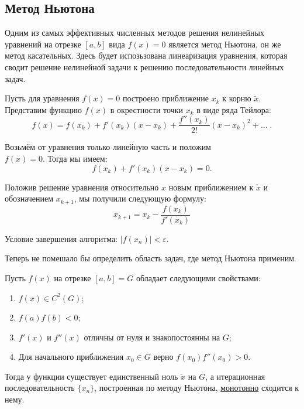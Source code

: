 \documentclass[../main.tex]{subfile}
\begin{document}
\subsection{Метод Ньютона}

Одним из самых эффективных численных методов решения нелинейных уравнений на
отрезке $[a,b]$ вида $f(x)=0$ является метод Ньютона, он же метод касательных.
Здесь будет испозьзована линеаризация уравнения, которая сводит решение
нелинейной задачи к решению последовательности линейных задач.

\begin{algorithm}\label{eq:newton_iteration}
	Пусть для уравнения $f(x)=0$ построено приближение $x_k$ к корню
	$\widetilde{x}$. Представим функцию $f(x)$ в окрестности точки $x_k$ в
	виде ряда Тейлора:
	\[f(x)=f(x_k)+f'(x_k)(x-x_k)+\frac{f''(x_k)}{2!}(x-x_k)^2+...\;.\]

	Возьмём от уравнения только линейную часть и положим \\
	$f(x)=0$. Тогда мы имеем:
	\[f(x_k)+f'(x_k)(x-x_k)=0.\]

	Положив решение уравнения относительно $x$ новым приближением к
	$\widetilde{x}$ и обозначением $x_{k+1}$, мы получили следующую формулу:
	\[\boxed{x_{k+1}=x_k-\frac{f(x_k)}{f'(x_k)}}\]

	Условие завершения алгоритма: $|f(x_n)|<\varepsilon$.
\end{algorithm}

Теперь не помешало бы определить область задач, где метод Ньютона применим.

\begin{theorem}\label{eq:newton_cond}
	Пусть $f(x)$ на отрезке $[a,b]=G$ обладает следующими свойствами:
	\begin{enumerate}
		\item $f(x)\in C^2(G)$;
		\item $f(a)f(b)<0$;
		\item $f'(x)$ и $f''(x)$ отличны от нуля и знакопостоянны на $G$;
		\item Для начального приближения $x_0\in G$ верно
			$f(x_0)f''(x_0)>0$.
	\end{enumerate}

	Тогда у функции существует единственный ноль $\widetilde{x}$ на $G$, а
	итерационная последовательность $\{x_n\}$, построенная по методу
	Ньютона, \underline{монотонно} сходится к нему.
\end{theorem}
\end{document}
